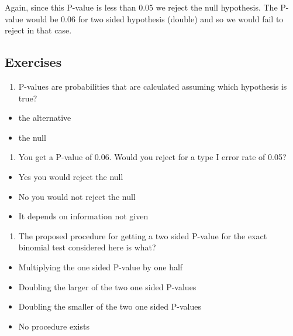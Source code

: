 \documentclass[]{article}
\begin{document}
Again, since this P-value is less than 0.05 we reject the null
hypothesis. The P-value would be 0.06 for two sided hypothesis (double)
and so we would fail to reject in that case.

\subsection{Exercises}\label{exercises-9}

\begin{enumerate}
\def\labelenumi{\arabic{enumi}.}
\itemsep1pt\parskip0pt
\item
  P-values are probabilities that are calculated assuming which
  hypothesis is true?
\end{enumerate}

\begin{itemize}
\itemsep1pt\parskip0pt
\item
  the alternative
\item
  the null
\end{itemize}

\begin{enumerate}
\def\labelenumi{\arabic{enumi}.}
\setcounter{enumi}{1}
\itemsep1pt\parskip0pt
\item
  You get a P-value of 0.06. Would you reject for a type I error rate of
  0.05?
\end{enumerate}

\begin{itemize}
\itemsep1pt\parskip0pt
\item
  Yes you would reject the null
\item
  No you would not reject the null
\item
  It depends on information not given
\end{itemize}

\begin{enumerate}
\def\labelenumi{\arabic{enumi}.}
\setcounter{enumi}{2}
\itemsep1pt\parskip0pt
\item
  The proposed procedure for getting a two sided P-value for the exact
  binomial test considered here is what?
\end{enumerate}

\begin{itemize}
\itemsep1pt\parskip0pt
\item
  Multiplying the one sided P-value by one half
\item
  Doubling the larger of the two one sided P-values
\item
  Doubling the smaller of the two one sided P-values
\item
  No procedure exists
\end{itemize}
\end{document}
